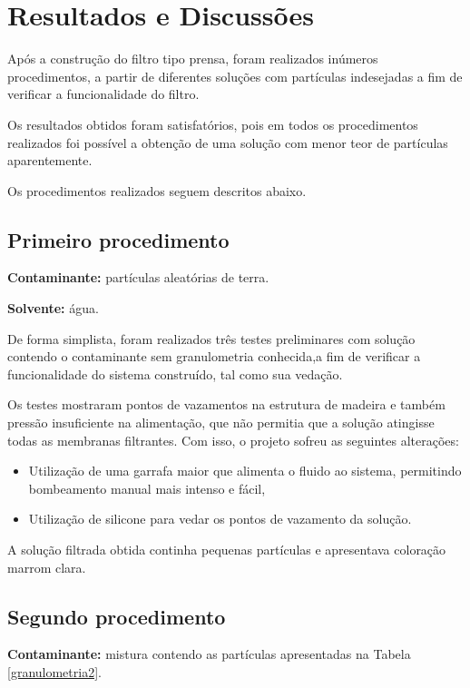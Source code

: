 \chapter{Resultados e Discussões}
\label{chap:resultados}

Após a construção do filtro tipo prensa, foram realizados inúmeros
procedimentos, a partir de diferentes soluções com partículas indesejadas a fim
de verificar a funcionalidade do filtro.

Os resultados obtidos foram satisfatórios, pois em todos os procedimentos
realizados foi possível a obtenção de uma solução com menor teor de partículas
aparentemente.

Os procedimentos realizados seguem descritos abaixo.

\section{Primeiro procedimento}
\label{sec:proc1}

\textbf{Contaminante:} partículas aleatórias de terra.

\textbf{Solvente:} água.

De forma simplista, foram realizados três testes preliminares com solução
contendo o contaminante sem granulometria conhecida,a fim de verificar
a funcionalidade do sistema construído, tal como sua vedação.

Os testes mostraram pontos de vazamentos na estrutura de madeira e também
pressão insuficiente na alimentação, que não permitia que a solução atingisse
todas as membranas filtrantes. Com isso, o projeto sofreu as seguintes
alterações:

\begin{itemize}
\item Utilização de uma garrafa maior que alimenta o fluido ao sistema,
  permitindo bombeamento manual mais intenso e fácil,
\item Utilização de silicone para vedar os pontos de vazamento da solução.
\end{itemize}

A solução filtrada obtida continha pequenas partículas e apresentava coloração
marrom clara.


\section{Segundo procedimento}
\label{sec:proc2}

\textbf{Contaminante:} mistura contendo as partículas apresentadas na Tabela
\ref{granulometria2}.

